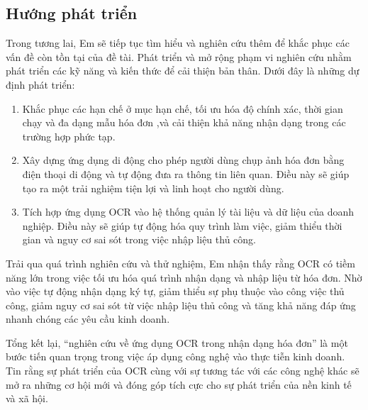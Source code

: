 \subsection*{Hướng phát triển}
Trong tương lai, Em sẽ tiếp tục tìm hiểu và nghiên cứu thêm để khắc phục các vấn đề còn tồn tại của đề tài. Phát triển và mở rộng phạm vi nghiên cứu nhằm phát triển các kỹ năng và kiến thức để cải thiện bản thân. Dưới đây là những dự định phát triển:
\begin{enumerate}
    \item Khắc phục các hạn chế ở mục hạn chế, tối ưu hóa độ chính xác, thời gian chạy và đa dạng mẫu hóa đơn ,và cải thiện khả năng nhận dạng trong các trường hợp phức tạp.
    \item Xây dựng ứng dụng di động cho phép người dùng chụp ảnh hóa đơn bằng điện thoại di động và tự động đưa ra thông tin liên quan. Điều này sẽ giúp tạo ra một trải nghiệm tiện lợi và linh hoạt cho người dùng.
    \item Tích hợp ứng dụng OCR vào hệ thống quản lý tài liệu và dữ liệu của doanh nghiệp. Điều này sẽ giúp tự động hóa quy trình làm việc, giảm thiểu thời gian và nguy cơ sai sót trong việc nhập liệu thủ công.
\end{enumerate}

Trải qua quá trình nghiên cứu và thử nghiệm, Em nhận thấy rằng OCR có tiềm năng lớn trong việc tối ưu hóa quá trình nhận dạng và nhập liệu từ hóa đơn. Nhờ vào việc tự động nhận dạng ký tự, giảm thiểu sự phụ thuộc vào công việc thủ công, giảm nguy cơ sai sót từ việc nhập liệu thủ công và tăng khả năng đáp ứng nhanh chóng các yêu cầu kinh doanh.

Tổng kết lại, ``nghiên cứu về ứng dụng OCR trong nhận dạng hóa đơn'' là một bước tiến quan trọng trong việc áp dụng công nghệ vào thực tiễn kinh doanh. Tin rằng sự phát triển của OCR cùng với sự tương tác với các công nghệ khác sẽ mở ra những cơ hội mới và đóng góp tích cực cho sự phát triển của nền kinh tế và xã hội.




